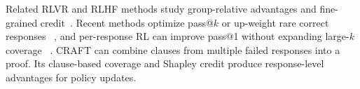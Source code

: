 Related RLVR and RLHF methods study group-relative advantages and
fine-grained credit~\citep{shao2024deepseekmath,li2026ssvpo,cao2025scar}.
Recent methods optimize pass@\(k\) or up-weight rare correct responses
~\citep{walder2025pkpo,chen2025passktraining,he2025unlikeliness}, and
per-response RL can improve pass@1 without expanding large-\(k\) coverage
~\citep{yue2025rlcapacity,he2025unlikeliness}. CRAFT can combine
clauses from multiple failed responses into a proof. Its clause-based coverage
and Shapley credit produce response-level advantages for policy updates.
